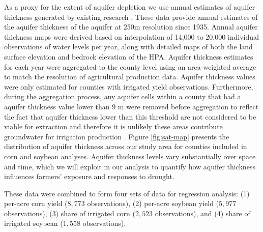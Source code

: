 \documentclass[
]{article}
\begin{document}
As a proxy for the extent of aquifer depletion we use annual estimates of aquifer thickness generated by existing research \citep{haacker2016water,haacker2023}. These data provide annual estimates of the aquifer thickness of the aquifer at 250m resolution since 1935. Annual aquifer thickness maps were derived based on interpolation of 14,000 to 20,000 individual observations of water levels per year, along with detailed maps of both the land surface elevation and bedrock elevation of the HPA. Aquifer thickness estimates for each year were aggregated to the county level using an area-weighted average to match the resolution of agricultural production data. Aquifer thickness values were only estimated for counties with irrigated yield observations. Furthermore, during the aggregation process, any aquifer cells within a county that had a aquifer thickness value lower than 9 m were removed before aggregation to reflect the fact that aquifer thickness lower than this threshold are not considered to be viable for extraction and therefore it is unlikely these areas contribute groundwater for irrigation production \citep{fenichel2016measuring, haacker2016water, deines2020transitions}. Figure \ref{fig:sat-map} presents the distribution of aquifer thickness across our study area for counties included in corn and soybean analyses. Aquifer thickness levels vary substantially over space and time, which we will exploit in our analysis to quantify how aquifer thickness influences farmers' exposure and responses to drought.

These data were combined to form four sets of data for regression analysis: (1) per-acre corn yield ($8,773$ observations), (2) per-acre soybean yield ($5,977$ observations), (3) share of irrigated corn ($2,523$ observations), and (4) share of irrigated soybean ($1,558$ observations).
\end{document}

